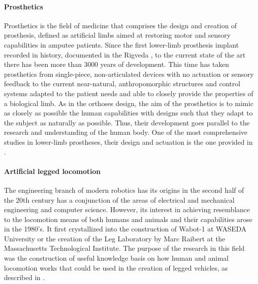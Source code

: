 \paragraph{Prosthetics} %
\label{par:prosthetics}
Prosthetics is the field of medicine that comprises the design and creation of prosthesis, defined as artificial limbs aimed at restoring motor and sensory capabilities in amputee patients.
Since the first lower-limb prosthesis implant recorded in history, documented in the Rigveda \cite{prosthetics_history}, to the current state of the art there has been more than 3000 years of development.
This time has taken prosthetics from single-piece, non-articulated devices with no actuation or sensory feedback to the current near-natural, anthropomorphic structures and control systems adapted to the patient needs and able to closely provide the properties of a biological limb.
As in the orthoses design, the aim of the prosthetics is to mimic as closely as possible the human capabilities with designs such that they adapt to the subject as naturally as possible.
Thus, their development goes parallel to the research and understanding of the human body.
One of the most comprehensive studies in lower-limb prostheses, their design and actuation is the one provided in \cite{grimmer}.


\paragraph{Artificial legged locomotion} %
\label{par:humanoid_robots}  
The engineering branch of modern robotics has its origins in the second half of the 20th century has a conjunction of the areas of electrical and mechanical engineering and computer science.
However, its interest in achieving resemblance to the locomotion means of both humans and animals  and their capabilities arose in the 1980's.
It first crystallized into the construction of Wabot-1 at WASEDA University or the creation of the Leg Laboratory by Marc Raibert at the Massachusetts Technological Institute.
The purpose of the research in this field was the construction of useful knowledge basis on how human and animal locomotion works that could be used in the creation of legged vehicles, as described in \cite{mit_leg_lab1}.


